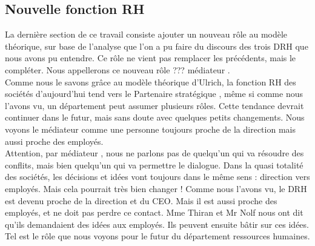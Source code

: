 \subsection{Nouvelle fonction RH}

La dernière section de ce travail consiste ajouter un nouveau rôle au modèle théorique, sur base de l'analyse que l'on a pu faire du discours des trois DRH que nous avons pu entendre. Ce rôle ne vient pas remplacer les précédents, mais le compléter.  Nous appellerons ce nouveau rôle ??? \og médiateur \fg{}.\\

Comme nous le savons grâce au modèle théorique d'Ulrich, la fonction RH des sociétés d'aujourd'hui tend vers le \og Partenaire stratégique \fg{}, même si comme nous l'avons vu, un département peut assumer plusieurs rôles. Cette tendance devrait continuer dans le futur, mais sans doute avec quelques petits changements. Nous voyons le médiateur comme une personne toujours proche de la direction mais aussi proche des employés. \\

Attention, par \og médiateur \fg{}, nous ne parlons pas de quelqu'un qui va résoudre des conflits, mais bien quelqu'un qui va permettre le dialogue. Dans la quasi totalité des sociétés, les décisions et idées vont toujours dans le même sens : direction vers employés. Mais cela pourrait très bien changer ! Comme nous l'avons vu, le DRH est devenu proche de la direction et du CEO. Mais il est aussi proche des employés, et ne doit pas perdre ce contact. Mme Thiran et Mr Nolf nous ont dit qu'ils demandaient des idées aux employés. Ils peuvent ensuite bâtir sur ces idées. Tel est le rôle que nous voyons pour le futur du département ressources humaines. \\